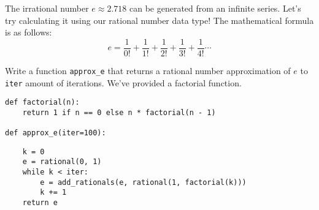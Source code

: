 \question The irrational number $e \approx 2.718$ can be generated from an infinite series.
Let's try calculating it using our rational number data type!
The mathematical formula is as follows:
\[
    e = \frac{1}{0!}+\frac{1}{1!} + \frac{1}{2!}+\frac{1}{3!}+\frac{1}{4!} \cdots
\]

Write a function {\tt approx\_e} that returns a rational number
approximation of $e$ to {\tt iter} amount of iterations. We've provided a factorial
function.
\begin{lstlisting}
def factorial(n):
    return 1 if n == 0 else n * factorial(n - 1)

def approx_e(iter=100):
\end{lstlisting}
\begin{solution}[2.0in]
\begin{lstlisting}
    k = 0
    e = rational(0, 1)
    while k < iter:
        e = add_rationals(e, rational(1, factorial(k)))
        k += 1
    return e
\end{lstlisting}
\end{solution}
